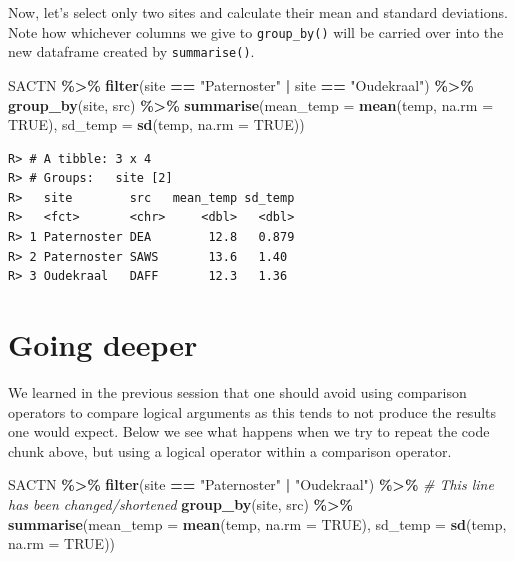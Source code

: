 \documentclass[
]{book}
\newenvironment{Shaded}{\begin{snugshade}}{\end{snugshade}}
\newcommand{\CommentTok}[1]{\textcolor[rgb]{0.56,0.35,0.01}{\textit{#1}}}
\newcommand{\DataTypeTok}[1]{\textcolor[rgb]{0.13,0.29,0.53}{#1}}
\newcommand{\KeywordTok}[1]{\textcolor[rgb]{0.13,0.29,0.53}{\textbf{#1}}}
\newcommand{\NormalTok}[1]{#1}
\newcommand{\OperatorTok}[1]{\textcolor[rgb]{0.81,0.36,0.00}{\textbf{#1}}}
\newcommand{\OtherTok}[1]{\textcolor[rgb]{0.56,0.35,0.01}{#1}}
\newcommand{\StringTok}[1]{\textcolor[rgb]{0.31,0.60,0.02}{#1}}
\begin{document}
Now, let's select only two sites and calculate their mean and standard deviations. Note how whichever columns we give to \texttt{group\_by()} will be carried over into the new dataframe created by \texttt{summarise()}.

\begin{Shaded}
\begin{Highlighting}[]
\NormalTok{SACTN }\OperatorTok{\%>\%}\StringTok{ }
\StringTok{  }\KeywordTok{filter}\NormalTok{(site }\OperatorTok{==}\StringTok{ "Paternoster"} \OperatorTok{|}\StringTok{ }\NormalTok{site }\OperatorTok{==}\StringTok{ "Oudekraal"}\NormalTok{) }\OperatorTok{\%>\%}
\StringTok{  }\KeywordTok{group\_by}\NormalTok{(site, src) }\OperatorTok{\%>\%}\StringTok{ }
\StringTok{  }\KeywordTok{summarise}\NormalTok{(}\DataTypeTok{mean\_temp =} \KeywordTok{mean}\NormalTok{(temp, }\DataTypeTok{na.rm =} \OtherTok{TRUE}\NormalTok{), }
            \DataTypeTok{sd\_temp =} \KeywordTok{sd}\NormalTok{(temp, }\DataTypeTok{na.rm =} \OtherTok{TRUE}\NormalTok{))}
\end{Highlighting}
\end{Shaded}

\begin{verbatim}
R> # A tibble: 3 x 4
R> # Groups:   site [2]
R>   site        src   mean_temp sd_temp
R>   <fct>       <chr>     <dbl>   <dbl>
R> 1 Paternoster DEA        12.8   0.879
R> 2 Paternoster SAWS       13.6   1.40 
R> 3 Oudekraal   DAFF       12.3   1.36
\end{verbatim}

\hypertarget{going-deeper}{%
\section{Going deeper}\label{going-deeper}}

We learned in the previous session that one should avoid using comparison operators to compare logical arguments as this tends to not produce the results one would expect. Below we see what happens when we try to repeat the code chunk above, but using a logical operator within a comparison operator.

\begin{Shaded}
\begin{Highlighting}[]
\NormalTok{SACTN }\OperatorTok{\%>\%}\StringTok{ }
\StringTok{  }\KeywordTok{filter}\NormalTok{(site }\OperatorTok{==}\StringTok{ "Paternoster"} \OperatorTok{|}\StringTok{ "Oudekraal"}\NormalTok{) }\OperatorTok{\%>\%}\StringTok{ }\CommentTok{\# This line has been changed/shortened}
\StringTok{  }\KeywordTok{group\_by}\NormalTok{(site, src) }\OperatorTok{\%>\%}\StringTok{ }
\StringTok{  }\KeywordTok{summarise}\NormalTok{(}\DataTypeTok{mean\_temp =} \KeywordTok{mean}\NormalTok{(temp, }\DataTypeTok{na.rm =} \OtherTok{TRUE}\NormalTok{), }
            \DataTypeTok{sd\_temp =} \KeywordTok{sd}\NormalTok{(temp, }\DataTypeTok{na.rm =} \OtherTok{TRUE}\NormalTok{))}
\end{Highlighting}
\end{Shaded}
\end{document}
